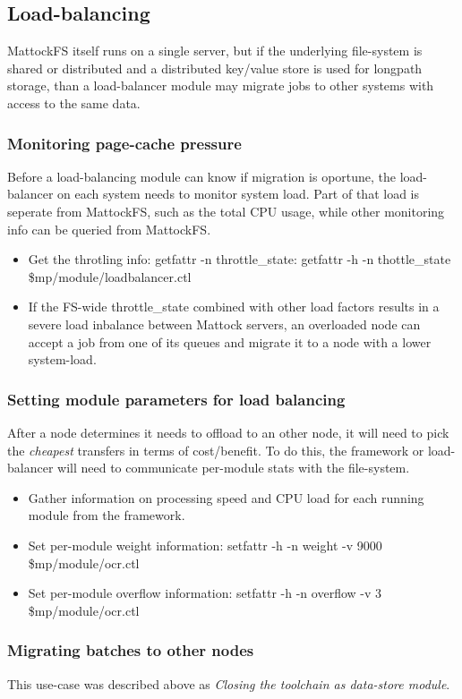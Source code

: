 \subsection{Load-balancing}
MattockFS itself runs on a single server, but if the underlying file-system is shared or distributed and a distributed key/value store is used for longpath storage, than a load-balancer module may migrate jobs to other systems with access to the same data.
\subsubsection{Monitoring page-cache pressure} 
Before a load-balancing module can know if migration is oportune, the load-balancer on each system needs to monitor system load. Part of that load is seperate from MattockFS, such as the total CPU usage, while other monitoring info can be queried from MattockFS.
\begin{itemize}
\item Get the throtling info: getfattr -n throttle\_state: getfattr -h -n thottle\_state \$mp/module/loadbalancer.ctl
\item If the FS-wide throttle\_state combined with other load factors results in a severe load inbalance between Mattock servers, an overloaded node can accept a job from one of its queues and migrate it to a node with a lower system-load.
\end{itemize}
\subsubsection{Setting module parameters for load balancing}
After a node determines it needs to offload to an other node, it will need to pick the \emph{cheapest} transfers in terms of cost/benefit. To do this, the framework or load-balancer will need to communicate per-module stats with the file-system.
\begin{itemize}
\item Gather information on processing speed and CPU load for each running module from the framework.
\item Set per-module weight information: setfattr -h -n weight -v 9000 \$mp/module/ocr.ctl
\item Set per-module overflow information: setfattr -h -n overflow -v 3 \$mp/module/ocr.ctl
\end{itemize}
\subsubsection{Migrating batches to other nodes}
This use-case was described above as \emph{Closing the toolchain as data-store module}.

